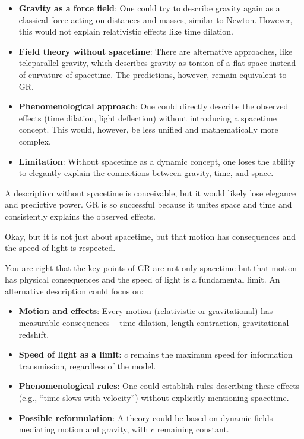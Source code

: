 \documentclass[a4paper,12pt]{article}
\begin{document}
	\begin{itemize}
		\item \textbf{Gravity as a force field}: One could try to describe gravity again as a classical force acting on distances and masses, similar to Newton. However, this would not explain relativistic effects like time dilation.
		\item \textbf{Field theory without spacetime}: There are alternative approaches, like teleparallel gravity, which describes gravity as torsion of a flat space instead of curvature of spacetime. The predictions, however, remain equivalent to GR.
		\item \textbf{Phenomenological approach}: One could directly describe the observed effects (time dilation, light deflection) without introducing a spacetime concept. This would, however, be less unified and mathematically more complex.
		\item \textbf{Limitation}: Without spacetime as a dynamic concept, one loses the ability to elegantly explain the connections between gravity, time, and space.
	\end{itemize}
	
	A description without spacetime is conceivable, but it would likely lose elegance and predictive power. GR is so successful because it unites space and time and consistently explains the observed effects.
	
	Okay, but it is not just about spacetime, but that motion has consequences and the speed of light is respected.
	
	You are right that the key points of GR are not only spacetime but that motion has physical consequences and the speed of light is a fundamental limit. An alternative description could focus on:
	
	\begin{itemize}
		\item \textbf{Motion and effects}: Every motion (relativistic or gravitational) has measurable consequences – time dilation, length contraction, gravitational redshift.
		\item \textbf{Speed of light as a limit}: \( c \) remains the maximum speed for information transmission, regardless of the model.
		\item \textbf{Phenomenological rules}: One could establish rules describing these effects (e.g., ``time slows with velocity'') without explicitly mentioning spacetime.
		\item \textbf{Possible reformulation}: A theory could be based on dynamic fields mediating motion and gravity, with \( c \) remaining constant.
	\end{itemize}
	
\end{document}
